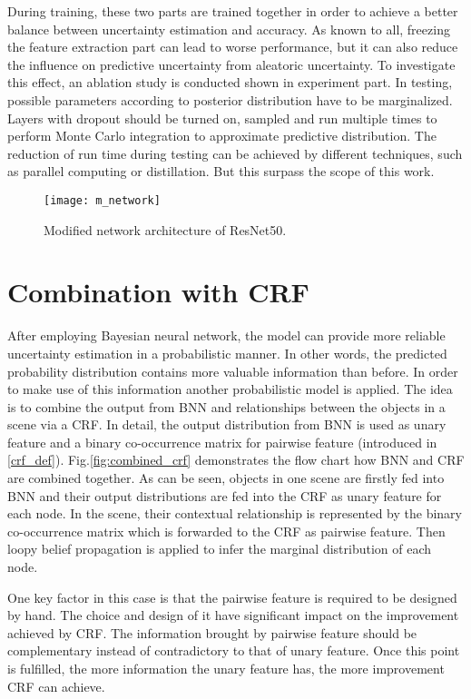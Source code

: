 During training, these two parts are trained together in order to achieve a better balance between uncertainty estimation and accuracy.
As known to all, freezing the feature extraction part can lead to worse performance, but it can also reduce the influence on predictive uncertainty from aleatoric uncertainty.
To investigate this effect, an ablation study is conducted shown in experiment part.
In testing, possible parameters according to posterior distribution have to be marginalized.
Layers with dropout should be turned on, sampled and run multiple times to perform Monte Carlo integration to approximate predictive distribution.
The reduction of run time during testing can be achieved by different techniques, such as parallel computing or distillation.
But this surpass the scope of this work.
\begin{figure}[H]
	\begin{center}
		\texttt{[image: m\_network]}
		\caption{Modified network architecture of ResNet50.}		
		\label{fig:modified_net}
	\end{center}
\end{figure}

\section{Combination with CRF}\label{com_crf}
After employing Bayesian neural network, the model can provide more reliable uncertainty estimation in a probabilistic manner.
In other words, the predicted probability distribution contains more valuable information than before.
In order to make use of this information another probabilistic model is applied.
The idea is to combine the output from BNN and relationships between the objects in a scene via a CRF.
In detail, the output distribution from BNN is used as unary feature and a binary co-occurrence matrix for pairwise feature (introduced in \ref{crf_def}). 
Fig.\ref{fig:combined_crf} demonstrates the flow chart how BNN and CRF are combined together.
As can be seen, objects in one scene are firstly fed into BNN and their output distributions are fed into the CRF as unary feature for each node.
In the scene, their contextual relationship is represented by the binary co-occurrence matrix which is forwarded to the CRF as pairwise feature.
Then loopy belief propagation is applied to infer the marginal distribution of each node.

One key factor in this case is that the pairwise feature is required to be designed by hand.
The choice and design of it have significant impact on the improvement achieved by CRF.
The information brought by pairwise feature should be complementary instead of contradictory to that of unary feature.
Once this point is fulfilled, the more information the unary feature has, the more improvement CRF can achieve. 

